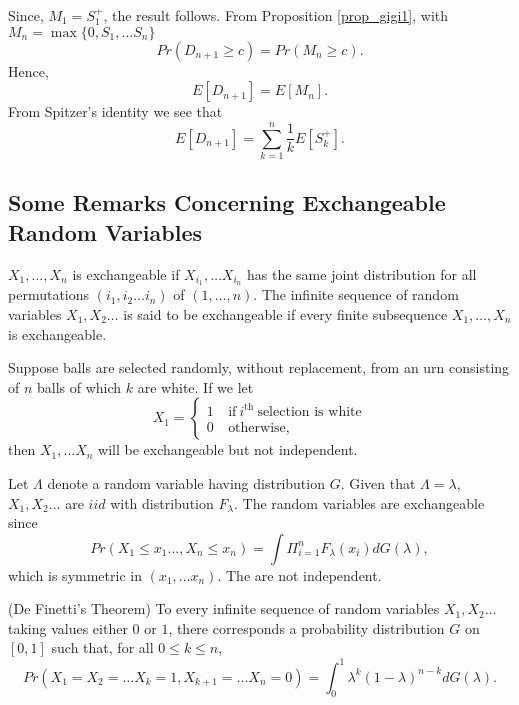 \documentclass[a4paper,10pt,english]{article}
\begin{document}
Since, $M_1 =S_1^+$, the result follows. From Proposition \ref{prop_gigi1}, with $M_n=\max\{0,S_1,\hdots S_n\}$
 \begin{equation*}
Pr(D_{n+1} \geq c) = Pr(M_n \geq c).
\end{equation*}
Hence,
 \begin{equation*}
E[D_{n+1}]=E[M_n].
\end{equation*}
From Spitzer's identity we see that
 \begin{equation*}
E[D_{n+1}]= \sum_{k=1}^{n} \frac{1}{k}E[S_k^+].
\end{equation*}

\subsection{Some Remarks Concerning Exchangeable Random Variables}
\begin{defn}
$X_1, \hdots ,X_n$ is exchangeable if $X_{i_1}, \hdots X_{i_n}$ has the same joint distribution for all permutations $(i_1,i_2 \hdots i_n)$ of $(1, \hdots ,n)$. The infinite sequence of random variables $X_1, X_2 \hdots$ is said to be exchangeable if every finite subsequence $X_1, \hdots ,X_n$ is exchangeable.
\end{defn}
\begin{exmp}
Suppose balls are selected randomly, without replacement, from an urn consisting of $n$ balls of which $k$ are white. If we let
\begin{displaymath}
   X_1 = \left\{
     \begin{array}{lr}
       1 & ~\text{if}~ i^{\text{th}}~ \text{selection is white} \\
       0 & ~\text{otherwise},
     \end{array}
   \right.
\end{displaymath}
then $X_1, \hdots X_n$ will be exchangeable but not independent. 
\end{exmp}
\begin{exmp}
Let $\Lambda$ denote a random variable having distribution $G$. Given that $\Lambda= \lambda$, $X_1, X_2 \hdots$ are $iid$ with distribution $F_\lambda$. The random variables are exchangeable since
\begin{equation*}
Pr(X_1 \leq x_1 \hdots , X_n \leq x_n) = \int \Pi_{i=1}^nF_\lambda(x_i)dG(\lambda),
\end{equation*}
which is symmetric in $(x_1, \hdots x_n)$. The are not independent.
\end{exmp}
\begin{thm}
(De Finetti's Theorem) To every infinite sequence of random variables $X_1, X_2 \hdots $ taking values either $0$ or $1$, there corresponds a probability distribution $G$ on $[0,1]$ such that, for all $0 \leq k \leq n$,
\begin{equation*}
\label{De Finetti}
Pr(X_1=X_2= \hdots X_k =1, X_{k+1}= \hdots X_n = 0)= \int_{0}^{1}\lambda^k(1-\lambda)^{n-k}dG(\lambda).
\end{equation*}  
\end{thm}
\end{document}
